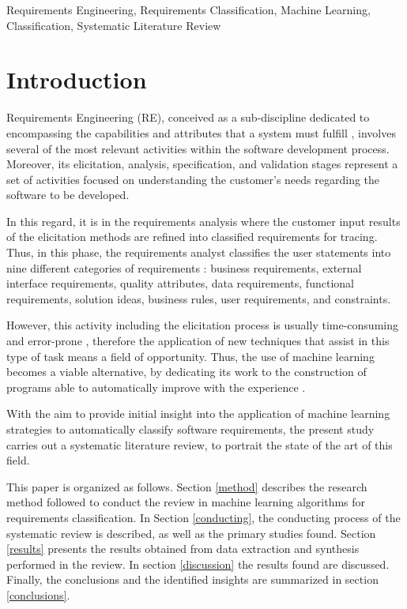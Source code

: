 \documentclass[conference]{IEEEtran}
\begin{document}
\begin{IEEEkeywords}
Requirements Engineering, Requirements Classification, Machine Learning, Classification, Systematic Literature Review
\end{IEEEkeywords}

\section{Introduction}
\label{introduction}

Requirements Engineering (RE), conceived as a sub-discipline dedicated to encompassing the capabilities and attributes that a system must fulfill \cite{Wiegers2013}, involves several of the most relevant activities within the software development process. Moreover, its elicitation, analysis, specification, and validation stages \cite{Kotonya:1998:REP:552009} represent a set of activities focused on understanding the customer's needs regarding the software to be developed.

In this regard, it is in the requirements analysis where the customer input results of the elicitation methods are refined into classified requirements for tracing. Thus, in this phase, the requirements analyst classifies the user statements into nine different categories of requirements \cite{Wiegers2013}: business requirements, external interface requirements, quality attributes, data requirements, functional requirements, solution ideas, business rules, user requirements, and constraints.

However, this activity including the elicitation process is usually time-consuming and error-prone \cite{METH20131695}, therefore the application of new techniques that assist in this type of task means a field of opportunity. Thus, the use of machine learning becomes a viable alternative, by dedicating its work to the construction of programs able to automatically improve with the experience \cite{Mitchell:1997:ML:541177}.

With the aim to provide initial insight into the application of machine learning strategies to automatically classify software requirements, the present study carries out a systematic literature review, to portrait the state of the art of this field.

This paper is organized as follows. Section \ref{method} describes the research method followed to conduct the review in machine learning algorithms for requirements classification. In Section \ref{conducting}, the conducting process of the systematic review is described, as well as the primary studies found. Section \ref{results} presents the results obtained from data extraction and synthesis performed in the review. In section \ref{discussion} the results found are discussed. Finally, the conclusions and the identified insights are summarized in section \ref{conclusions}.
\end{document}
